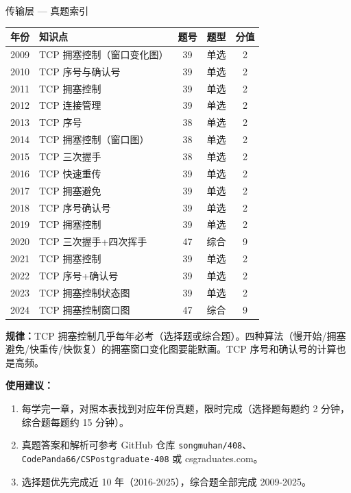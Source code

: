 \begin{tablebox}{传输层 — 真题索引}
\centering
\begin{tabular}{|c|l|c|c|c|}
\hline
年份 & 知识点 & 题号 & 题型 & 分值 \\
\hline
2009 & TCP 拥塞控制（窗口变化图）& 39 & 单选 & 2 \\
2010 & TCP 序号与确认号 & 39 & 单选 & 2 \\
2011 & TCP 拥塞控制 & 39 & 单选 & 2 \\
2012 & TCP 连接管理 & 39 & 单选 & 2 \\
2013 & TCP 序号 & 38 & 单选 & 2 \\
2014 & TCP 拥塞控制（窗口图）& 38 & 单选 & 2 \\
2015 & TCP 三次握手 & 38 & 单选 & 2 \\
2016 & TCP 快速重传 & 39 & 单选 & 2 \\
2017 & TCP 拥塞避免 & 39 & 单选 & 2 \\
2018 & TCP 序号确认号 & 39 & 单选 & 2 \\
2019 & TCP 拥塞控制 & 39 & 单选 & 2 \\
2020 & TCP 三次握手+四次挥手 & 47 & 综合 & 9 \\
2021 & TCP 拥塞控制 & 39 & 单选 & 2 \\
2022 & TCP 序号+确认号 & 39 & 单选 & 2 \\
2023 & TCP 拥塞控制状态图 & 39 & 单选 & 2 \\
2024 & TCP 拥塞控制窗口图 & 47 & 综合 & 9 \\
\hline
\end{tabular}
\end{tablebox}

\noindent\textbf{规律：}TCP 拥塞控制几乎每年必考（选择题或综合题）。四种算法（慢开始/拥塞避免/快重传/快恢复）的拥塞窗口变化图要能默画。TCP 序号和确认号的计算也是高频。

\vspace{12pt}

\noindent\textbf{使用建议：}
\begin{enumerate}
    \item 每学完一章，对照本表找到对应年份真题，限时完成（选择题每题约 2 分钟，综合题每题约 15 分钟）。
    \item 真题答案和解析可参考 GitHub 仓库 \texttt{songmuhan/408}、\texttt{CodePanda66/CSPostgraduate-408} 或 csgraduates.com。
    \item 选择题优先完成近 10 年（2016-2025），综合题全部完成 2009-2025。
\end{enumerate}
